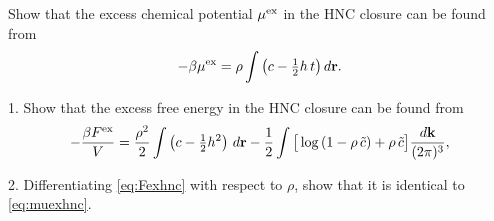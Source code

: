 \documentclass{book}
\begin{document}

Show that the excess chemical potential ${ { \mu }^{ \mathrm{ex} } }$ in the HNC closure
can be found from\cite{morita1960, singer1985}
\begin{equation}
  -\beta { { \mu }^{ \mathrm{ex} } } = \rho \int \left( c - \tfrac{1}{2} h \, t\right) d\boldsymbol{\mathbf{r}}.
  \label{eq:muexhnc}
\end{equation}




1. Show that the excess free energy in the HNC closure
can be found from\cite{morita1958, morita1960, singer1985}
\begin{align}
    - \frac{ \beta { { F }^{ \mathrm{ex} } } } { V }
    = \frac{\rho^2}{2} \int \left( c - \tfrac{1}{2} h^2 \right) \, d\boldsymbol{\mathbf{r}}
      - \frac{1}{2} \int  \big[
              \log\left( 1 - \rho \, \tilde{c} \right)
                           + \rho \, \tilde{c}
                         \big]  \frac{ d \boldsymbol{\mathbf{k}} }{(2\pi)^3},
\label{eq:Fexhnc}
\end{align}

2. Differentiating \eqref{eq:Fexhnc} with respect to $\rho$,
show that it is identical to \eqref{eq:muexhnc}.


%
%
%





\end{document}
